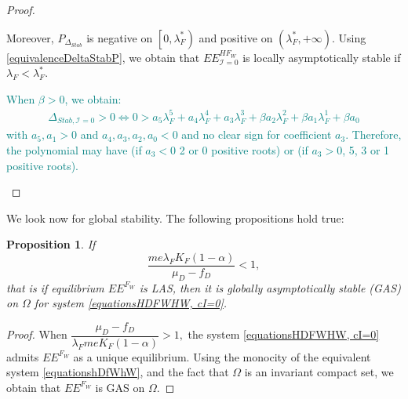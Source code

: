 \documentclass{article}
\newcommand{\lfw}{\lambda_{F}}
\newcommand{\lfw}{\lambda_{F}}
\newcommand{\cI}{\mathcal{I}}
\newcommand{\marc}[1]{\textcolor{teal}{#1}}
\newtheorem{prop}{Proposition}
\begin{document}
\begin{proof}
\begin{itemize}
Moreover, $P_{\Delta_{Stab}}$ is negative on $\left[0, \lfw^* \right)$ and positive on $\left(\lfw ^*, +\infty \right)$. Using \eqref{equivalenceDeltaStabP}, we obtain that $EE^{HF_W}_{\cI = 0}$ is locally asymptotically stable if $\lfw  < \lfw ^*$.

\marc{
When $\beta > 0$, we obtain:
\begin{multline*}
\Delta_{Stab, \cI = 0} > 0 \Leftrightarrow 0 > a_5 \lfw ^5 + a_4 \lfw ^4 + a_3 \lfw ^3 + \beta a_2 \lfw ^2 + \beta a_1 \lfw ^1 + \beta a_0
\end{multline*}
with $a_5, a_1 > 0$ and $a_4, a_3, a_2, a_0 < 0$ and no clear sign for coefficient $a_3$. Therefore, the polynomial may have (if $a_3<0$ 2 or 0 positive roots) or (if $a_3 > 0$, 5, 3 or 1 positive roots).}

\end{itemize}
\end{proof}

%
%
We look now for global stability. The following propositions hold true:

\begin{prop}\label{propEEFGAS}If 
$$
\dfrac{m e \lfw K_F(1-\alpha)}{\mu_D - f_D} < 1,
$$
that is if equilibrium $EE^{F_W}$ is LAS, then it is globally asymptotically stable (GAS) on $\Omega$ for system \eqref{equationsHDFWHW, cI=0}.
\end{prop}

\begin{proof}
When $\dfrac{\mu_D - f_D}{\lfw m e K_F(1-\alpha)} >1,$ the system \eqref{equationsHDFWHW, cI=0} admits $EE^{F_W}$ as a unique equilibrium. Using the monocity of the equivalent system \eqref{equationshDfWhW}, and the fact that $\Omega$ is an invariant compact set, we obtain that $EE^{F_W}$ is GAS on $\Omega$.
\end{proof}
\end{document}

